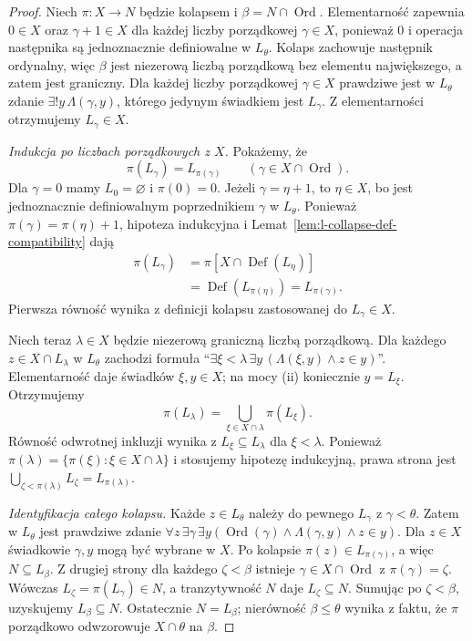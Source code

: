 \begin{proof}
Niech $\pi:X\to N$ będzie kolapsem i
$\beta=N\cap\operatorname{Ord}$.
Elementarność zapewnia $0\in X$ oraz
$\gamma+1\in X$ dla każdej liczby porządkowej
$\gamma\in X$, ponieważ $0$ i operacja następnika
są jednoznacznie definiowalne w $L_\theta$.
Kolaps zachowuje następnik ordynalny, więc $\beta$
jest niezerową liczbą porządkową bez elementu
największego, a zatem jest graniczny.
Dla każdej liczby porządkowej $\gamma\in X$
prawdziwe jest w $L_\theta$ zdanie
$\exists!y\,\Lambda(\gamma,y)$, którego jedynym
świadkiem jest $L_\gamma$. Z elementarności otrzymujemy
$L_\gamma\in X$.

\emph{Indukcja po liczbach porządkowych z $X$.}
Pokażemy, że
\[
\pi(L_\gamma)=L_{\pi(\gamma)}
\qquad(\gamma\in X\cap\operatorname{Ord}).
\]
Dla $\gamma=0$ mamy $L_0=\varnothing$ i $\pi(0)=0$.
Jeżeli $\gamma=\eta+1$, to $\eta\in X$, bo jest
jednoznacznie definiowalnym poprzednikiem
$\gamma$ w $L_\theta$.
Ponieważ $\pi(\gamma)=\pi(\eta)+1$, hipoteza
indukcyjna i Lemat~\ref{lem:l-collapse-def-compatibility}
dają
\begin{align*}
\pi(L_\gamma)
 &=\pi[X\cap\operatorname{Def}(L_\eta)]\\
 &=\operatorname{Def}(L_{\pi(\eta)})
  =L_{\pi(\gamma)}.
\end{align*}
Pierwsza równość wynika z definicji kolapsu
zastosowanej do $L_\gamma\in X$.

Niech teraz $\lambda\in X$ będzie niezerową
graniczną liczbą porządkową.
Dla każdego $z\in X\cap L_\lambda$ w $L_\theta$
zachodzi formuła
``$\exists\xi<\lambda\,\exists y\,
(\Lambda(\xi,y)\land z\in y)$''.
Elementarność daje świadków $\xi,y\in X$;
na mocy (ii) koniecznie $y=L_\xi$.
Otrzymujemy
\[
\pi(L_\lambda)=
 \bigcup_{\xi\in X\cap\lambda}\pi(L_\xi).
\]
Równość odwrotnej inkluzji wynika z
$L_\xi\subseteq L_\lambda$ dla $\xi<\lambda$.
Ponieważ $\pi(\lambda)=\{\pi(\xi):\xi\in X\cap\lambda\}$
i stosujemy hipotezę indukcyjną, prawa strona
jest $\bigcup_{\zeta<\pi(\lambda)}L_\zeta
=L_{\pi(\lambda)}$.

\emph{Identyfikacja całego kolapsu.}
Każde $z\in L_\theta$ należy do pewnego $L_\gamma$
z $\gamma<\theta$. Zatem w $L_\theta$ jest prawdziwe
zdanie $\forall z\,\exists\gamma\,\exists y
(\operatorname{Ord}(\gamma)\land\Lambda(\gamma,y)
\land z\in y)$.
Dla $z\in X$ świadkowie $\gamma,y$ mogą być
wybrane w $X$. Po kolapsie $\pi(z)\in L_{\pi(\gamma)}$,
a więc $N\subseteq L_\beta$.
Z drugiej strony dla każdego $\zeta<\beta$ istnieje
$\gamma\in X\cap\operatorname{Ord}$ z
$\pi(\gamma)=\zeta$. Wówczas
$L_\zeta=\pi(L_\gamma)\in N$, a tranzytywność
$N$ daje $L_\zeta\subseteq N$.
Sumując po $\zeta<\beta$, uzyskujemy
$L_\beta\subseteq N$. Ostatecznie $N=L_\beta$;
nierówność $\beta\le\theta$ wynika z faktu,
że $\pi$ porządkowo odwzorowuje $X\cap\theta$
na $\beta$.
\end{proof}
